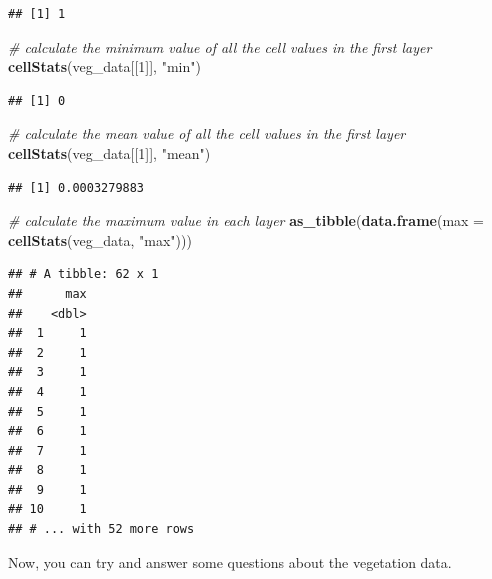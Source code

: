 \documentclass[12pt,]{book}
\newenvironment{Shaded}{\begin{snugshade}}{\end{snugshade}}
\newcommand{\KeywordTok}[1]{\textcolor[rgb]{0.13,0.29,0.53}{\textbf{#1}}}
\newcommand{\DataTypeTok}[1]{\textcolor[rgb]{0.13,0.29,0.53}{#1}}
\newcommand{\DecValTok}[1]{\textcolor[rgb]{0.00,0.00,0.81}{#1}}
\newcommand{\StringTok}[1]{\textcolor[rgb]{0.31,0.60,0.02}{#1}}
\newcommand{\CommentTok}[1]{\textcolor[rgb]{0.56,0.35,0.01}{\textit{#1}}}
\newcommand{\NormalTok}[1]{#1}
\begin{document}
\begin{verbatim}
## [1] 1
\end{verbatim}

\begin{Shaded}
\begin{Highlighting}[]
\CommentTok{# calculate the minimum value of all the cell values in the first layer}
\KeywordTok{cellStats}\NormalTok{(veg_data[[}\DecValTok{1}\NormalTok{]], }\StringTok{"min"}\NormalTok{)}
\end{Highlighting}
\end{Shaded}

\begin{verbatim}
## [1] 0
\end{verbatim}

\begin{Shaded}
\begin{Highlighting}[]
\CommentTok{# calculate the mean value of all the cell values in the first layer}
\KeywordTok{cellStats}\NormalTok{(veg_data[[}\DecValTok{1}\NormalTok{]], }\StringTok{"mean"}\NormalTok{)}
\end{Highlighting}
\end{Shaded}

\begin{verbatim}
## [1] 0.0003279883
\end{verbatim}

\begin{Shaded}
\begin{Highlighting}[]
\CommentTok{# calculate the maximum value in each layer}
\KeywordTok{as_tibble}\NormalTok{(}\KeywordTok{data.frame}\NormalTok{(}\DataTypeTok{max =} \KeywordTok{cellStats}\NormalTok{(veg_data, }\StringTok{"max"}\NormalTok{)))}
\end{Highlighting}
\end{Shaded}

\begin{verbatim}
## # A tibble: 62 x 1
##      max
##    <dbl>
##  1     1
##  2     1
##  3     1
##  4     1
##  5     1
##  6     1
##  7     1
##  8     1
##  9     1
## 10     1
## # ... with 52 more rows
\end{verbatim}

Now, you can try and answer some questions about the vegetation data.
\end{document}
